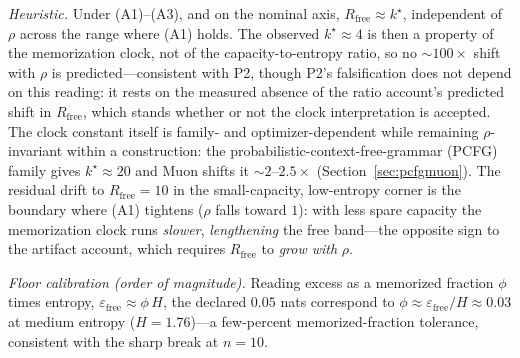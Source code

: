 \documentclass[11pt]{article}
\begin{document}
\emph{Heuristic.} Under (A1)--(A3), and on the nominal axis, $R_{\mathrm{free}} \approx k^\star$, independent of
$\rho$ across the range where (A1) holds. The observed $k^\star \approx 4$ is then a property
of the memorization clock, not of the capacity-to-entropy ratio, so no ${\sim}100\times$
shift with $\rho$ is predicted---consistent with P2, though P2's falsification does not
depend on this reading: it rests on the measured absence of the ratio account's
predicted shift in $R_{\mathrm{free}}$, which stands whether or not the clock
interpretation is accepted. The clock constant itself is family- and
optimizer-dependent while remaining $\rho$-invariant within a construction: the probabilistic-context-free-grammar (PCFG)
family gives $k^\star\approx20$ and Muon shifts it ${\sim}2$--$2.5\times$
(Section~\ref{sec:pcfgmuon}). The residual drift to $R_{\mathrm{free}}=10$ in
the small-capacity, low-entropy corner is the boundary where (A1) tightens ($\rho$ falls
toward $1$): with less spare capacity the memorization clock runs \emph{slower},
\emph{lengthening} the free band---the opposite sign to the artifact account, which requires
$R_{\mathrm{free}}$ to \emph{grow with} $\rho$.

\emph{Floor calibration (order of magnitude).} Reading excess as a memorized fraction
$\phi$ times entropy, $\varepsilon_{\mathrm{free}} \approx \phi\,H$, the declared $0.05$ nats
correspond to $\phi \approx \varepsilon_{\mathrm{free}}/H \approx 0.03$ at medium entropy
($H{=}1.76$)---a few-percent memorized-fraction tolerance, consistent with the sharp break at
$n{=}10$.
\end{document}

